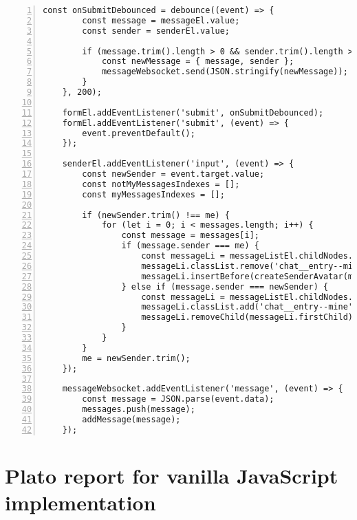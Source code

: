 \begin{appendices}
\begin{lstlisting}[numbers=left]
	const onSubmitDebounced = debounce((event) => {
		const message = messageEl.value;
		const sender = senderEl.value;
		
		if (message.trim().length > 0 && sender.trim().length > 0) {
			const newMessage = { message, sender };
			messageWebsocket.send(JSON.stringify(newMessage));
		}
	}, 200);
	
	formEl.addEventListener('submit', onSubmitDebounced);
	formEl.addEventListener('submit', (event) => {
		event.preventDefault();
	});
	
	senderEl.addEventListener('input', (event) => {
		const newSender = event.target.value;
		const notMyMessagesIndexes = [];
		const myMessagesIndexes = [];
		
		if (newSender.trim() !== me) {
			for (let i = 0; i < messages.length; i++) {
				const message = messages[i];
				if (message.sender === me) {
					const messageLi = messageListEl.childNodes.item(i);
					messageLi.classList.remove('chat__entry--mine');
					messageLi.insertBefore(createSenderAvatar(message.sender), messageLi.firstChild);
				} else if (message.sender === newSender) {
					const messageLi = messageListEl.childNodes.item(i);
					messageLi.classList.add('chat__entry--mine');
					messageLi.removeChild(messageLi.firstChild);
				}
			}
		}
		me = newSender.trim();
	});
	
	messageWebsocket.addEventListener('message', (event) => {
		const message = JSON.parse(event.data);
		messages.push(message);
		addMessage(message);
	});
	\end{lstlisting}
	
	\chapter{Plato report for vanilla JavaScript implementation}
	\label{appendix:plato-vanilla}
	

\end{appendices}
